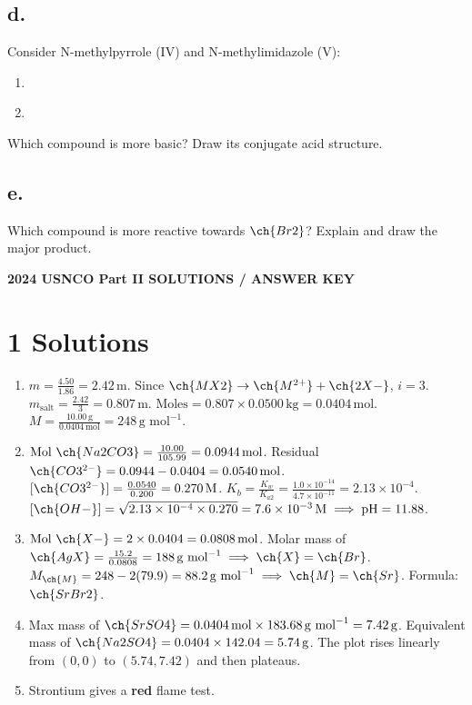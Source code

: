 \documentclass[11pt]{article}
\begin{document}
\subsection*{d.} Consider N-methylpyrrole (IV) and N-methylimidazole (V):
\begin{center}
\begin{enumerate}[label=\Roman*., start=4]
\item {} \\
\item {}
\end{enumerate}
\end{center}
Which compound is more basic? Draw its conjugate acid structure.
\vspace{3cm}

\subsection*{e.} Which compound is more reactive towards $\ch{Br2}$? Explain and draw the major product.
\vspace{4cm}

\newpage
\begin{center}
{\Large \textbf{2024 USNCO Part II SOLUTIONS / ANSWER KEY}}
\end{center}
\setcounter{section}{0}

\section{1 Solutions}
\begin{enumerate}[label=\alph*.]
    \item $m = \frac{4.50}{1.86} = 2.42\,\text{m}$. Since $\ch{MX2} \rightarrow \ch{M^{2+}} + \ch{2X-}$, $i=3$.
    $m_{\text{salt}} = \frac{2.42}{3} = 0.807\,\text{m}$.
    $\text{Moles} = 0.807 \times 0.0500\,\text{kg} = 0.0404\,\text{mol}$.
    $M = \frac{10.00\,\text{g}}{0.0404\,\text{mol}} = 248\,\text{g mol}^{-1}$.
    \item $\text{Mol }\ch{Na2CO3} = \frac{10.00}{105.99} = 0.0944\,\text{mol}$. Residual $\ch{CO3^{2-}} = 0.0944 - 0.0404 = 0.0540\,\text{mol}$.
    $[\ch{CO3^{2-}}] = \frac{0.0540}{0.200} = 0.270\,\text{M}$.
    $K_b = \frac{K_w}{K_{a2}} = \frac{1.0\times10^{-14}}{4.7\times10^{-11}} = 2.13\times10^{-4}$.
    $[\ch{OH-}] = \sqrt{2.13\times10^{-4} \times 0.270} = 7.6\times10^{-3}\,\text{M} \implies \text{pH} = 11.88$.
    \item $\text{Mol }\ch{X-} = 2 \times 0.0404 = 0.0808\,\text{mol}$. Molar mass of $\ch{AgX} = \frac{15.2}{0.0808} = 188\,\text{g mol}^{-1} \implies \ch{X} = \ch{Br}$.
    $M_{\ch{M}} = 248 - 2(79.9) = 88.2\,\text{g mol}^{-1} \implies \ch{M} = \ch{Sr}$. Formula: $\ch{SrBr2}$.
    \item Max mass of $\ch{SrSO4} = 0.0404\,\text{mol} \times 183.68\,\text{g mol}^{-1} = 7.42\,\text{g}$. Equivalent mass of $\ch{Na2SO4} = 0.0404 \times 142.04 = 5.74\,\text{g}$. The plot rises linearly from $(0,0)$ to $(5.74, 7.42)$ and then plateaus.
    \item Strontium gives a \textbf{red} flame test.
\end{enumerate}
\end{document}
